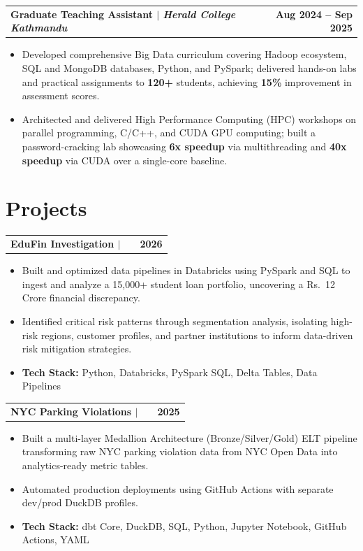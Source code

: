 \documentclass[a4paper,10.5pt]{article}
\makeatletter
\newenvironment{joblong}[2]
    {
    \begin{tabularx}{\linewidth}{@{}l X r@{}}
    \textbf{#1} & \hfill &  #2 \\[2pt]
    \end{tabularx}
    \begin{minipage}[t]{\linewidth}
    \begin{itemize}[nosep,after=\strut, leftmargin=1em, itemsep=1pt,label=--]
    }
    {
    \end{itemize}
    \end{minipage}    
    }
\makeatother
\begin{document}
\vspace{1pt}

\begin{joblong}{Graduate Teaching Assistant $|$ \normalfont\textit{Herald College Kathmandu}}{\textbf{Aug 2024 -- Sep 2025}}
\item Developed comprehensive Big Data curriculum covering Hadoop ecosystem, SQL and MongoDB databases, Python, and PySpark; delivered hands-on labs and practical assignments to \textbf{120+} students, achieving \textbf{15\%} improvement in assessment scores.
\item Architected and delivered High Performance Computing (HPC) workshops on parallel programming, C/C++, and CUDA GPU computing; built a password-cracking lab showcasing \textbf{6x speedup} via multithreading and \textbf{40x speedup} via CUDA over a single-core baseline.
\end{joblong}

\section{Projects}

\vspace{5pt}

\begin{joblong}{EduFin Investigation $|$ \normalfont{\textit{Financial Data Analytics}}} {\textbf{2026}}
\item Built and optimized data pipelines in Databricks using PySpark and SQL to ingest and analyze a 15,000+ student loan portfolio, uncovering a Rs.\ 12 Crore financial discrepancy.
\item Identified critical risk patterns through segmentation analysis, isolating high-risk regions, customer profiles, and partner institutions to inform data-driven risk mitigation strategies.
\item \textbf{Tech Stack:} Python, Databricks, PySpark SQL, Delta Tables, Data Pipelines
\end{joblong}

\begin{joblong}{NYC Parking Violations $|$ \normalfont{\textit{Data Engineering}}} {\textbf{2025}}
\item Built a multi-layer Medallion Architecture (Bronze/Silver/Gold) ELT pipeline transforming raw NYC parking violation data from NYC Open Data into analytics-ready metric tables.
\item Automated production deployments using GitHub Actions with separate dev/prod DuckDB profiles.
\item \textbf{Tech Stack:} dbt Core, DuckDB, SQL, Python, Jupyter Notebook, GitHub Actions, YAML
\end{joblong}
\end{document}
